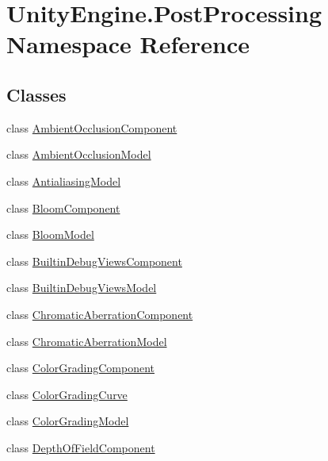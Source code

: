 \hypertarget{namespace_unity_engine_1_1_post_processing}{}\section{Unity\+Engine.\+Post\+Processing Namespace Reference}
\label{namespace_unity_engine_1_1_post_processing}
\subsection*{Classes}
\begin{DoxyCompactItemize}
\item 
class \hyperlink{class_unity_engine_1_1_post_processing_1_1_ambient_occlusion_component}{Ambient\+Occlusion\+Component}
\item 
class \hyperlink{class_unity_engine_1_1_post_processing_1_1_ambient_occlusion_model}{Ambient\+Occlusion\+Model}
\item 
class \hyperlink{class_unity_engine_1_1_post_processing_1_1_antialiasing_model}{Antialiasing\+Model}
\item 
class \hyperlink{class_unity_engine_1_1_post_processing_1_1_bloom_component}{Bloom\+Component}
\item 
class \hyperlink{class_unity_engine_1_1_post_processing_1_1_bloom_model}{Bloom\+Model}
\item 
class \hyperlink{class_unity_engine_1_1_post_processing_1_1_builtin_debug_views_component}{Builtin\+Debug\+Views\+Component}
\item 
class \hyperlink{class_unity_engine_1_1_post_processing_1_1_builtin_debug_views_model}{Builtin\+Debug\+Views\+Model}
\item 
class \hyperlink{class_unity_engine_1_1_post_processing_1_1_chromatic_aberration_component}{Chromatic\+Aberration\+Component}
\item 
class \hyperlink{class_unity_engine_1_1_post_processing_1_1_chromatic_aberration_model}{Chromatic\+Aberration\+Model}
\item 
class \hyperlink{class_unity_engine_1_1_post_processing_1_1_color_grading_component}{Color\+Grading\+Component}
\item 
class \hyperlink{class_unity_engine_1_1_post_processing_1_1_color_grading_curve}{Color\+Grading\+Curve}
\item 
class \hyperlink{class_unity_engine_1_1_post_processing_1_1_color_grading_model}{Color\+Grading\+Model}
\item 
class \hyperlink{class_unity_engine_1_1_post_processing_1_1_depth_of_field_component}{Depth\+Of\+Field\+Component}

\end{DoxyCompactItemize}
